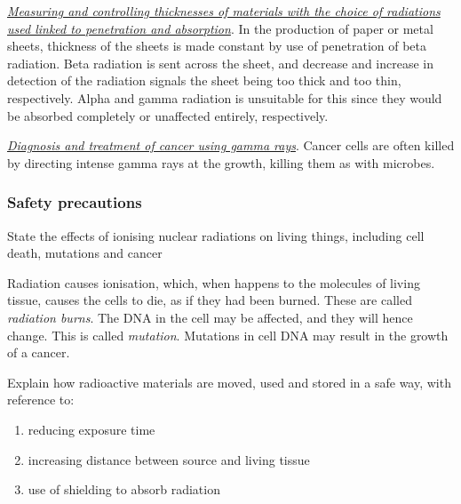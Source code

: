 \emph{\ul{Measuring and controlling thicknesses of materials with the choice of
radiations used linked to penetration and absorption}}. In the production of paper
or metal sheets, thickness of the sheets is made constant by use of penetration of
beta radiation. Beta radiation is sent across the sheet, and decrease and increase
in detection of the radiation signals the sheet being too thick and too thin,
respectively. Alpha and gamma radiation is unsuitable for this since they would be
absorbed completely or unaffected entirely, respectively.

\emph{\ul{Diagnosis and treatment of cancer using gamma rays}}. Cancer cells are often
killed by directing intense gamma rays at the growth, killing them as with microbes.

\subsubsection{Safety precautions}
\begin{subpoint}
State the effects of ionising nuclear radiations on living things, including cell death, mutations and cancer
\end{subpoint}

Radiation causes ionisation, which, when happens to the molecules of living tissue,
causes the cells to die, as if they had been burned. These are called \emph{radiation
burns}. The DNA in the cell may be affected, and they will hence change. This is
called \emph{mutation}. Mutations in cell DNA may result in the growth of a cancer.

\begin{subpoint}
	Explain how radioactive materials are moved, used and stored in a safe way, with
	reference to:
	\begin{enumerate}[label=(\alph*)]
		\setlength\itemsep{0em}
		\item reducing exposure time
		\item increasing distance between source and living tissue
		\item use of shielding to absorb radiation
	\end{enumerate}
\end{subpoint}
